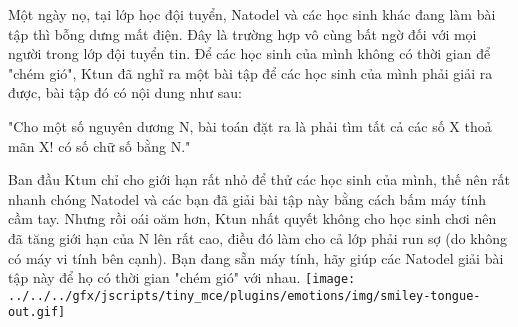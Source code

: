 Một ngày nọ, tại lớp học đội tuyển, Natodel và các học sinh khác đang làm bài tập thì bỗng dưng mất điện. Đây là trường hợp vô cùng bất ngờ đối với mọi người trong lớp đội tuyển tin. Để các học sinh của mình không có thời gian để "chém gió", Ktun đã nghĩ ra một bài tập để các học sinh của mình phải giải ra được, bài tập đó có nội dung như sau:  

   "Cho một số nguyên dương N, bài toán đặt ra là phải tìm tất cả các số X thoả mãn X! có số chữ số bằng N."  

   Ban đầu Ktun chỉ cho giới hạn rất nhỏ để thử các học sinh của mình, thế nên rất nhanh chóng Natodel và các bạn đã giải bài tập này bằng cách bấm máy tính cầm tay. Nhưng rồi oái oăm hơn, Ktun nhất quyết không cho học sinh chơi nên đã tăng giới hạn của N lên rất cao, điều đó làm cho cả lớp phải run sợ (do không có máy vi tính bên cạnh). Bạn đang sẵn máy tính, hãy giúp các Natodel giải bài tập này để họ có thời gian "chém gió" với nhau.   
\texttt{[image: ../../../gfx/jscripts/tiny\_mce/plugins/emotions/img/smiley-tongue-out.gif]}

\